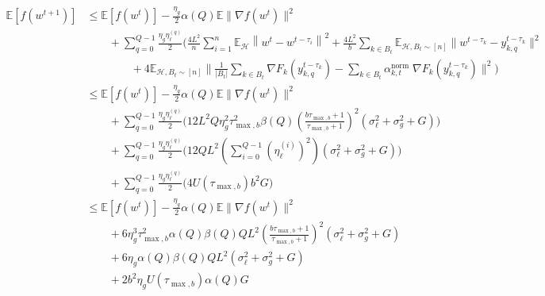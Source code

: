 \documentclass{article}
\begin{document}
\begin{align*}
    \mathbb{E}[f(w^{t+1})]
    &\leq 
    \mathbb{E}[f(w^{t})]
    -\frac{\eta_g}{2}\alpha(Q) { \mathbb{E}\| \nabla f(w^t) \|^2} 
    \\    
    &\qquad + 
    \sum_{q=0}^{Q-1}{
            \frac{
                \eta_g \eta_\ell^{(q)}
            }{
                2            
            }}\bigg(
    \frac{4L^2}{n}\sum_{i=1}^n \mathbb{E}_{\mathcal{H}}\left\|
    w^t - w^{t-\tau_i}
    \right\|^2 +
        \frac{4L^2}{b}
        \sum_{k \in B_t}
        {
        \mathbb{E}_{\mathcal{H}, B_t \sim [n]}
        \Bigg\| w^{t-\tau_k} - y_{k, q}^{t - \tau_k} \Bigg\|^2
        }      
    \\
        &\qquad\qquad +
        4 \mathbb{E}_{\mathcal{H}, B_t \sim [n]}
        \Bigg\| 
        \frac{1}{|B_t|} \sum_{k \in B_t}{
             \nabla F_k(y_{k, q}^{t - \tau_k})
        }
        -
        \sum_{k \in B_t}{
            \alpha^{\text{norm}}_{k, t} \; \nabla F_k(y_{k, q}^{t - \tau_k})
        }
        \Bigg\|^2  
    \bigg)
    \\
    &\leq 
    \mathbb{E}[f(w^{t})]
    -\frac{\eta_g}{2}\alpha(Q) {\mathbb{E}\| \nabla f(w^t) \|^2} 
    \\    
    &\qquad + 
    \sum_{q=0}^{Q-1}{
            \frac{
                \eta_g \eta_\ell^{(q)}
            }{
                2            
            }}
    \bigg(
    12L^2 
    Q\eta_g^2 \tau_{\max, b}^2  \beta(Q)
            \left( \frac{b\tau_{\max, b} + 1}{\tau_{\max, b} + 1}\right)^2
            \left(\sigma_\ell^2 + \sigma^2_g + G \right)
    \bigg)
    \\
    &\qquad +
    \sum_{q=0}^{Q-1}{
            \frac{
                \eta_g \eta_\ell^{(q)}
            }{
                2            
            }}
    \bigg(
        12QL^2
         \left(
            \sum_{i=0}^{Q-1}{\left(\eta_\ell^{(i)}\right)^2}
        \right) ( \sigma_\ell^2 + \sigma_g^2 + G)
    \bigg)
    \\
    &\qquad
     +
    \sum_{q=0}^{Q-1}{
            \frac{
                \eta_g \eta_\ell^{(q)}
            }{
                2            
            }}
    \bigg(
        4  U(\tau_{\max, b}) b^2  G
    \bigg)
    \\
    &\leq 
    \mathbb{E}[f(w^{t})] 
    -\frac{\eta_g}{2}\alpha(Q) {\mathbb{E}\| \nabla f(w^t) \|^2} 
    \\    
    &\qquad + 
    6 \eta_g^3 \tau_{\max, b}^2  \alpha(Q) \beta(Q) Q  L^2 
    \left( \frac{b\tau_{\max, b} + 1}{\tau_{\max, b} + 1}\right)^2
    \left(\sigma_\ell^2 + \sigma^2_g + G \right)
    \\
    &\qquad +
    6 \eta_g \alpha(Q) \beta(Q)  Q L^2 ( \sigma_\ell^2 + \sigma_g^2 + G) 
    \\
    &\qquad 
    +
     2 b^2 \eta_g  U(\tau_{\max, b}) \alpha(Q) G
\end{align*}
\end{document}
